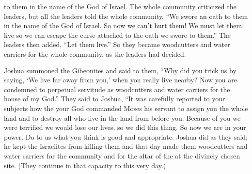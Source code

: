 {to them in the name of the
{}
God
of Israel.
The whole
community
criticized
the leaders,
but all
the leaders
told
the whole
community,
“We
swore an oath
to them in the name of the
{}
God
of Israel.
So now
we can’t
hurt them!
We must
let them live
so we can escape
the curse
attached to
the oath
we swore to them.”
The leaders
then added, “Let them live.”
So they became
woodcutters
and water
carriers
for the whole
community,
as
the leaders
had decided.
\par }{\PP Joshua
summoned
the Gibeonites and said
to
them, “Why
did you trick
us by saying,
‘We
live far away
from
you,’ when you really
live
nearby?
Now
you
are condemned
to perpetual
servitude
as woodcutters
and water
carriers
for the house
of my God.”
They said
to Joshua,
“It was carefully reported
to your subjects
how
the {}
your God
commanded
Moses
his servant
to assign
you the
whole
land
and to destroy
all
who live
in the land
from before
you. Because of you we were terrified
we would lose our lives,
so we did
this
thing.
So now
we are in your power.
Do
to us what you think is good
and appropriate.
Joshua did
as
they said; he kept
the Israelites
from killing them
and that day
made
them
woodcutters
and water
carriers
for the community
and for the altar
of the {}
at the divinely chosen
site.
(They continue in that capacity to this
very
day.)

}
